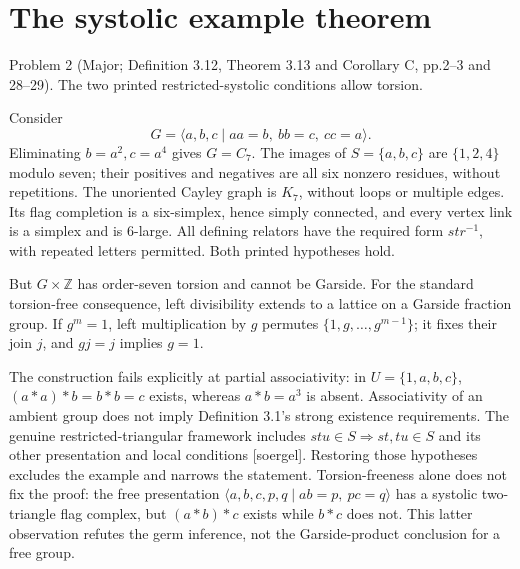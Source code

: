 \documentclass[10pt]{article}
\begin{document}
\section*{The systolic example theorem}
Problem 2 (Major; Definition 3.12, Theorem 3.13 and Corollary C, pp.2–3 and 28–29).  The two printed restricted-systolic conditions allow torsion.\par
Consider \[G=\langle a,b,c\mid aa=b,\ bb=c,\ cc=a\rangle.\] Eliminating \(b=a^2,c=a^4\) gives \(G=C_7\). The images of \(S=\{a,b,c\}\) are \(\{1,2,4\}\) modulo seven; their positives and negatives are all six nonzero residues, without repetitions. The unoriented Cayley graph is \(K_7\), without loops or multiple edges. Its flag completion is a six-simplex, hence simply connected, and every vertex link is a simplex and is 6-large. All defining relators have the required form \(st r^{-1}\), with repeated letters permitted. Both printed hypotheses hold.\par
But \(G\times\mathbb Z\) has order-seven torsion and cannot be Garside. For the standard torsion-free consequence, left divisibility extends to a lattice on a Garside fraction group. If \(g^m=1\), left multiplication by \(g\) permutes \(\{1,g,\ldots,g^{m-1}\}\); it fixes their join \(j\), and \(gj=j\) implies \(g=1\).\par
The construction fails explicitly at partial associativity: in \(U=\{1,a,b,c\}\), \((a*a)*b=b*b=c\) exists, whereas \(a*b=a^3\) is absent. Associativity of an ambient group does not imply Definition 3.1’s strong existence requirements. The genuine restricted-triangular framework includes \(stu\in S\Rightarrow st,tu\in S\) and its other presentation and local conditions [soergel]. Restoring those hypotheses excludes the example and narrows the statement. Torsion-freeness alone does not fix the proof: the free presentation \(\langle a,b,c,p,q\mid ab=p,\ pc=q\rangle\) has a systolic two-triangle flag complex, but \((a*b)*c\) exists while \(b*c\) does not. This latter observation refutes the germ inference, not the Garside-product conclusion for a free group.\par
\end{document}
